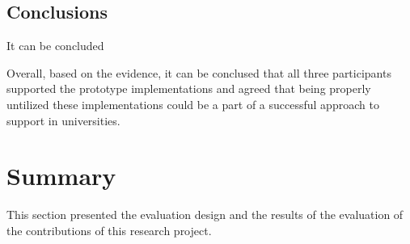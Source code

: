 \subsection{Conclusions}

It can be concluded

Overall, based on the evidence, it can be conclused that all three participants
supported the prototype implementations and agreed that being properly untilized
these implementations could be a part of a successful approach to \LLLs support
in universities.
 
\section{Summary}

This section presented the evaluation design and the results of the evaluation
of the contributions of this research project.
